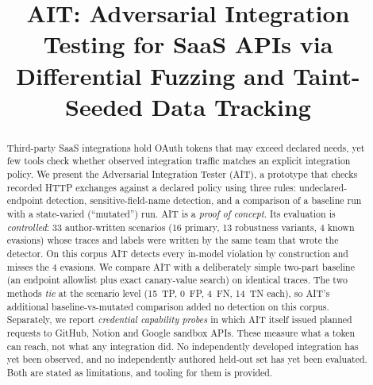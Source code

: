 \documentclass[conference]{IEEEtran}
\begin{document}
\title{AIT: Adversarial Integration Testing for SaaS APIs via
Differential Fuzzing and Taint-Seeded Data Tracking}

\author{
}

\maketitle

\begin{abstract}
Third-party SaaS integrations hold OAuth tokens that may exceed declared
needs, yet few tools check whether observed integration traffic matches an
explicit integration policy. We present the Adversarial Integration
Tester (AIT), a prototype that checks recorded HTTP exchanges against a
declared policy using three rules: undeclared-endpoint detection,
sensitive-field-name detection, and a comparison of a baseline run with a
state-varied (``mutated'') run. AIT is a \emph{proof of concept}. Its
evaluation is \emph{controlled}: 33 author-written scenarios (16 primary,
13 robustness variants, 4 known evasions) whose traces and labels were
written by the same team that wrote the detector. On this corpus AIT
detects every in-model violation by construction and misses the 4
evasions. We compare AIT with a deliberately simple two-part baseline (an
endpoint allowlist plus exact canary-value search) on identical traces.
The two methods \emph{tie} at the scenario level (15~TP, 0~FP, 4~FN,
14~TN each), so AIT's additional baseline-vs-mutated comparison added no
detection on this corpus. Separately, we report \emph{credential
capability probes} in which AIT itself issued planned requests to GitHub,
Notion and Google sandbox APIs. These measure what a token can reach, not
what any integration did. No independently developed integration has
yet been observed, and no independently authored held-out set has yet
been evaluated. Both are stated as limitations, and tooling for them is
provided.
\end{abstract}
\end{document}
